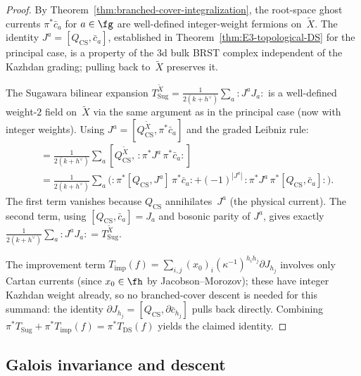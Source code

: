 \begin{proof}
By Theorem~\ref{thm:branched-cover-integralization}, the root-space
ghost currents $\pi^{*}\bar c_{a}$ for $a \in \fg$ are well-defined
integer-weight fermions on~$\widetilde X$. The identity
$J^{a} = [Q_{\mathrm{CS}}, \bar c_{a}]$, established in
Theorem~\ref{thm:E3-topological-DS}
\cite[Step~1]{Vol2-3d-gravity-thm-DS} for the principal case, is a
property of the $3$d bulk BRST complex independent of the Kazhdan
grading; pulling back to~$\widetilde X$ preserves it.

The Sugawara bilinear expansion
$T_{\mathrm{Sug}}^{\widetilde X}
 = \tfrac{1}{2(k+h^{\vee})}\sum_{a} :J^{a} J_{a}:$
is a well-defined weight-$2$ field on~$\widetilde X$ via the same
argument as in the principal case (now with integer weights).
Using $J^{a} = [Q_{\mathrm{CS}}^{\widetilde X}, \pi^{*}\bar c_{a}]$
and the graded Leibniz rule:
\begin{align*}
[Q_{\mathrm{CS}}^{\widetilde X},\, \pi^{*}G_{\mathrm{Sug}}]
&= \tfrac{1}{2(k+h^{\vee})} \sum_{a}
 [Q_{\mathrm{CS}}^{\widetilde X},\,
  {:}\pi^{*}J^{a}\, \pi^{*}\bar c_{a}{:}] \\
&= \tfrac{1}{2(k+h^{\vee})} \sum_{a}
 \bigl({:}\pi^{*}[Q_{\mathrm{CS}}, J^{a}]\, \pi^{*}\bar c_{a}{:}
  + (-1)^{|J^{a}|}\,
   {:}\pi^{*}J^{a}\, \pi^{*}[Q_{\mathrm{CS}}, \bar c_{a}]{:}\bigr).
\end{align*}
The first term vanishes because $Q_{\mathrm{CS}}$ annihilates~$J^{a}$
(the physical current). The second term, using
$[Q_{\mathrm{CS}}, \bar c_{a}] = J_{a}$ and bosonic parity of $J^{a}$,
gives exactly $\tfrac{1}{2(k+h^{\vee})}\sum_{a} {:}J^{a} J_{a}{:}
= T_{\mathrm{Sug}}^{\widetilde X}$.

The improvement term
$T_{\mathrm{imp}}(f) = \sum_{i,j} (x_{0})_{i}
 (\kappa^{-1})^{h_{i}h_{j}} \partial J_{h_{j}}$
involves only Cartan currents (since $x_{0} \in \fh$ by
Jacobson--Morozov); these have integer Kazhdan weight already, so
no branched-cover descent is needed for this summand: the identity
$\partial J_{h_{j}} = [Q_{\mathrm{CS}},
 \partial\bar c_{h_{j}}]$ pulls back directly. Combining
$\pi^{*}T_{\mathrm{Sug}} + \pi^{*}T_{\mathrm{imp}}(f)
 = \pi^{*}T_{\mathrm{DS}}(f)$
yields the claimed identity.
\end{proof}

\subsection{Galois invariance and descent}
\label{subsec:galois-descent}

